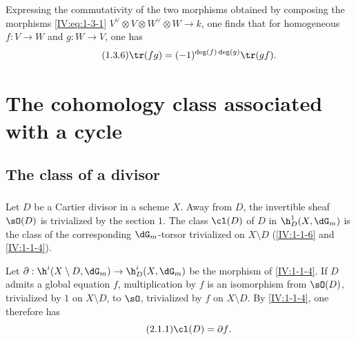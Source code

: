 \documentclass[oneside]{book}
\begin{document}
Expressing the commutativity of the two morphisms obtained by composing the
morphisms \eqref{IV:eq:1-3-1}
$V^\vee\otimes V\otimes W^\vee\otimes W\to k$, one finds that for homogeneous
$f:V\to W$ and $g:W\to V$, one has
\begin{equation*}\tag{1.3.6}\label{IV:eq:1-3-6}
  \tr(f g) = (-1)^{\deg(f)\deg(g)} \tr(g f) \text{.}
\end{equation*}




















\section{The cohomology class associated with a cycle}\label{IV:2}










\subsection{The class of a divisor}\label{IV:2-1}






\subsubsection{}\label{IV:2-1-1}

Let $D$ be a Cartier divisor in a scheme $X$. Away from $D$, the invertible
sheaf $\sO(D)$ is trivialized by the section $1$. The class $\cl(D)$ of $D$
in $\h_D^1(X,\dG_m)$ is the class of the corresponding $\dG_m$-torsor
trivialized on $X\setminus D$ (\ref{IV:1-1-6} and \ref{IV:1-1-4}).

Let $\partial:\h^i(X\setminus D,\dG_m)\to \h_D^i(X,\dG_m)$ be the morphism
of \ref{IV:1-1-4}. If $D$ admits a global equation $f$, multiplication by
$f$ is an isomorphism from $\sO(D)$, trivialized by $1$ on $X\setminus D$,
to $\sO$, trivialized by $f$ on $X\setminus D$. By \ref{IV:1-1-4}, one
therefore has
\begin{equation*}\tag{2.1.1}\label{IV:eq:2-1-1}
  \cl(D) = \partial f \text{.}
\end{equation*}
\end{document}
